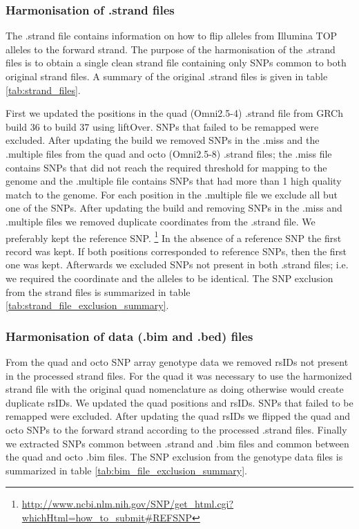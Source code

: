\subsubsection{Harmonisation of .strand files}
The .strand file contains information on how to flip alleles from Illumina TOP alleles to the forward strand. The purpose of the harmonisation of the .strand files is to obtain a single clean strand file containing only SNPs common to both original strand files. A summary of the original .strand files is given in table \ref{tab:strand_files}.


First we updated the positions in the quad (Omni2.5-4) .strand file from \gls{GRCh}\cite{10.1371/journal.pbio.1001091} build 36 to build 37 using liftOver.\cite{Karolchik01012014} SNPs that failed to be remapped were excluded. After updating the build we removed \glspl{SNP} in the .miss and the .multiple files from the quad and octo (Omni2.5-8) .strand files; the .miss file contains \glspl{SNP} that did not reach the required threshold for mapping to the genome and the .multiple file contains \glspl{SNP} that had more than 1 high quality match to the genome. For each position in the .multiple file we exclude all but one of the \glspl{SNP}.
After updating the build and removing \glspl{SNP} in the .miss and .multiple files we removed duplicate coordinates from the .strand file. We preferably kept the reference \gls{SNP}.
\footnote{\url{http://www.ncbi.nlm.nih.gov/SNP/get_html.cgi?whichHtml=how_to_submit\#REFSNP}} In the absence of a reference SNP the first record was kept. If both positions corresponded to reference SNPs, then the first one was kept.
Afterwards we excluded \glspl{SNP} not present in both .strand files; i.e. we required the coordinate and the alleles to be identical. The SNP exclusion from the strand files is summarized in table \ref{tab:strand_file_exclusion_summary}.


\subsubsection{Harmonisation of data (.bim and .bed) files}
From the quad and octo \gls{SNP} array genotype data we removed rsIDs not present in the processed strand files. For the quad it was necessary to use the harmonized strand file with the original quad nomenclature as doing otherwise would create duplicate rsIDs. We updated the quad positions and rsIDs. SNPs that failed to be remapped were excluded. After updating the quad rsIDs we flipped the quad and octo \glspl{SNP} to the forward strand according to the processed .strand files. Finally we extracted \glspl{SNP} common between .strand and .bim files and common between the quad and octo .bim files. The SNP exclusion from the genotype data files is summarized in table \ref{tab:bim_file_exclusion_summary}.


